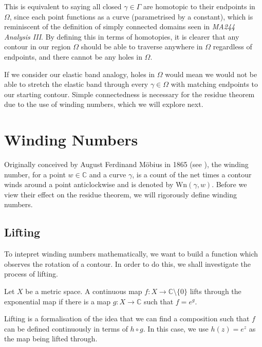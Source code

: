 \documentclass[a4paper]{article}
\def\Wind{\text{Wn}}
\begin{document}
This is equivalent to saying all closed $\gamma \in \Gamma$ are homotopic to their endpoints in $\Omega$, since each point functions as a curve (parametrised by a constant), which is reminiscent of the definition of simply connected domains seen in \textit{MA244 Analysis III}. By defining this in terms of homotopies, it is clearer that any contour in our region $\Omega$ should be able to traverse anywhere in $\Omega$ regardless of endpoints, and there cannot be any holes in $\Omega$. 

If we consider our elastic band analogy, holes in $\Omega$ would mean we would not be able to stretch the elastic band through every  $\gamma \in \Omega$ with matching endpoints to our starting contour. Simple connectedness is necessary for the residue theorem due to the use of winding numbers, which we will explore next.

\section{Winding Numbers}

Originally conceived by August Ferdinand M{\"o}bius in 1865 (see \citep{Mobius}), the winding number, for a point $w \in \mathbb{C}$ and a curve $\gamma$, is a count of the net times a contour winds around a point anticlockwise and is denoted by $\Wind(\gamma,w)$. Before we view their effect on the residue theorem, we will rigorously define winding numbers.

\subsection{Lifting}

To intepret winding numbers mathematically, we want to build a function which observes the rotation of a contour. In order to do this, we shall investigate the process of lifting.

\begin{definition}{\citep[p.27]{Roe}}{}
Let $X$ be a metric space. A continuous map $f : X \rightarrow \mathbb{C}\setminus\{0\}$ lifts through the exponential map if there is a map $g : X \rightarrow \mathbb{C}$  such that $f = e^{g}$. 
\end{definition}

Lifting is a formalisation of the idea that we can find a composition such that $f$ can be defined continuously in terms of $h \circ g$. In this case, we use $h(z) = e^{z}$ as the map being lifted through.

\end{document}
